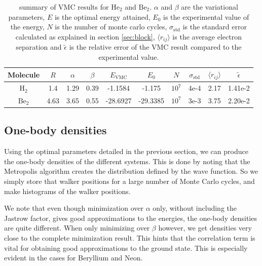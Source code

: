 \documentclass[aps,prc,twocolumn,floatfix]{revtex4}
\begin{document}
\begin{table}
\centering
 \begin{tabular}{|cccccccccc|}
  \hline
  Molecule & $R$ & $\alpha$ & $\beta$ & $E_{\text{VMC}}$& $E_0$ & $N$ & $\sigma_\text{std}$ & $\langle r_{ij} \rangle$ & $\tilde{\epsilon}$ \\
  \hline 
  $\text{H}_2$ & 1.4 & 1.29 & 0.39 & -1.1584 & -1.175 & $10^7$ & 4e-4 & 2.17 & 1.41e-2\\
  $\text{Be}_2$ & 4.63 & 3.65 & 0.55 & -28.6927 & -29.3385 & $10^7$ & 3e-3 & 3.75 & 2.20e-2 \\
  \hline
 \end{tabular}

 \caption{summary of VMC results for $\text{He}_2$ and $\text{Be}_2$. $\alpha$ and $\beta$ are the variational parameters, $E$ is the optimal energy attained, $E_0$ is the experimental value of the energy, $N$ is the number of monte carlo cycles,   $\sigma_{\text{std}}$ is the standard error calculated as explained in section \ref{sec:block}, $\langle r_{ij} \rangle$ is the average electron separation and $\tilde{\epsilon}$ is the relative error of the VMC result compared to the experimental value.}
 \label{tab:4}
\end{table}



\subsection{One-body densities}
Using the optimal parameters detailed in the previous section, we can produce the one-body densities of the different systems. This is done by noting that the Metropolis algorithm creates the distribution defined by the wave function. So we simply store that walker positions for a large number of Monte Carlo cycles, and make histograms of the walker positions.

We note that even though minimization over $\alpha$ only, without including the Jastrow factor, gives good approximations to the energies, the one-body densities are quite different. When only minimizing over $\beta$ however, we get densities very close to the complete minimization result. This hints that the correlation term is vital for obtaining good approximations to the ground state. This is especially evident in the cases for Beryllium and Neon.
\end{document}
